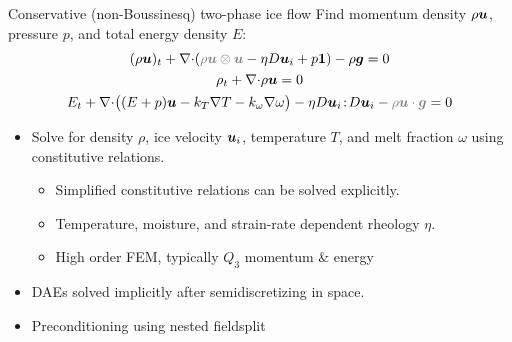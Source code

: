 \documentclass{beamer}
\begin{document}


\newcommand\smallterm[1]{{\color{gray} #1}}
\begin{frame}{Conservative (non-Boussinesq) two-phase ice flow}
  Find momentum density $\rho\bm u$, pressure $p$, and total energy density $E$:
  \begin{gather*}
    (\rho\uu)_t + \div (\smallterm{\rho\uu\otimes\uu} - \eta D\uu_i + p\bm 1) - \rho \bm g = 0 \\
    \rho_t + \div \rho\uu = 0 \\
    E_t + \div \big((E+p)\uu - k_T\nabla T - k_\omega\nabla\omega \big) - \eta D\uu_i\tcolon D\uu_i - \smallterm{\rho\uu\cdot\bm g} = 0
  \end{gather*}
\begin{itemize}
\item Solve for density $\rho$, ice velocity $\bm u_i$, temperature $T$, and melt fraction $\omega$ using constitutive relations.
  \begin{itemize}
  \item Simplified constitutive relations can be solved explicitly.
  \item Temperature, moisture, and strain-rate dependent rheology $\eta$.
  \item High order FEM, typically $Q_3$ momentum \& energy
  \end{itemize}
\item DAEs solved implicitly after semidiscretizing in space.
\item Preconditioning using nested fieldsplit
\end{itemize}
\end{frame}




\end{document}
